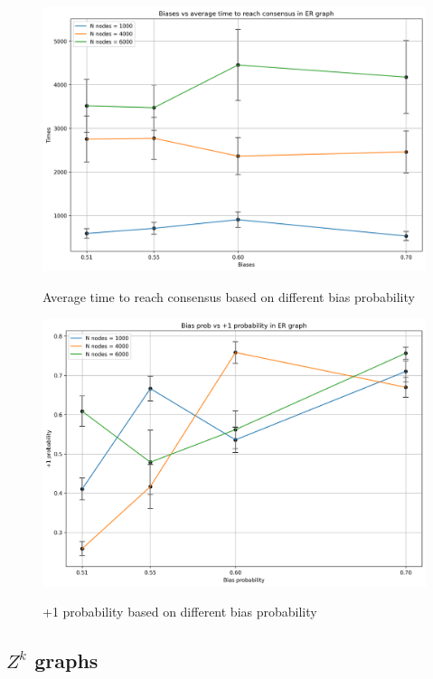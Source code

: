 \documentclass[conference]{IEEEtran}
\begin{document}
        

        \begin{figure}[!ht]
            \centering
            \includegraphics[width=\columnwidth]{media/er_times.png}
            \label{fig:er_times}
            \caption[short]{Average time to reach consensus based on different bias probability}
        \end{figure}

        \begin{figure}[!ht]
            \centering
            \includegraphics[width=\columnwidth]{media/er_consensus.png}
            \label{fig:er_consensus}
            \caption[short]{+1 probability based on different bias probability}
        \end{figure}

    \subsection{$Z^k$ graphs}
\end{document}

